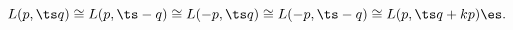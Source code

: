 \begin{equation}
L(p,\ts q) \cong L(p,\ts -q) \cong L(-p,\ts q) \cong L(-p,\ts -q) \cong 
L(p,\ts q + k p) \es.
\label{eq:DhnTrvl}
\end{equation}

